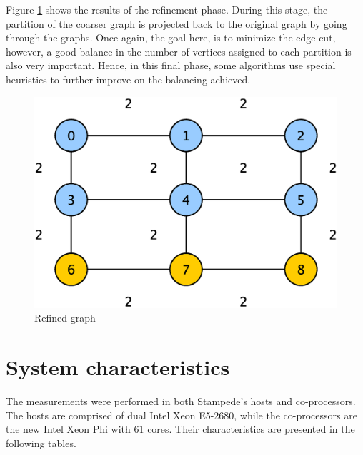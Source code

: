 \documentclass[abstract=on,9pt,twocolumn]{scrartcl}
\begin{document}
Figure \ref{img:refined_graph} shows the results of the refinement phase. During this stage, the partition of the coarser graph is projected back to the original graph by going through the graphs.\cite{Karypis:1998:FHQ:305219.305248}
Once again, the goal here, is to minimize the edge-cut, however, a good balance in the number of vertices assigned to each partition is also very important. Hence, in this final phase, some algorithms use special heuristics to further improve on the balancing achieved.
\begin{center}
  \begin{figure}[htb]
    \includegraphics[width=\columnwidth]{img/refinement.eps}
    \caption{Refined graph}
    \label{img:refined_graph} 
  \end{figure}
\end{center}



\section{System characteristics}
\label{sec:sys_char}

The measurements were performed in both Stampede's hosts and
co-processors.
The hosts are comprised of dual Intel Xeon E5-2680, while the
co-processors are the new Intel Xeon Phi with 61 cores. Their
characteristics are presented in the following tables.
\end{document}

